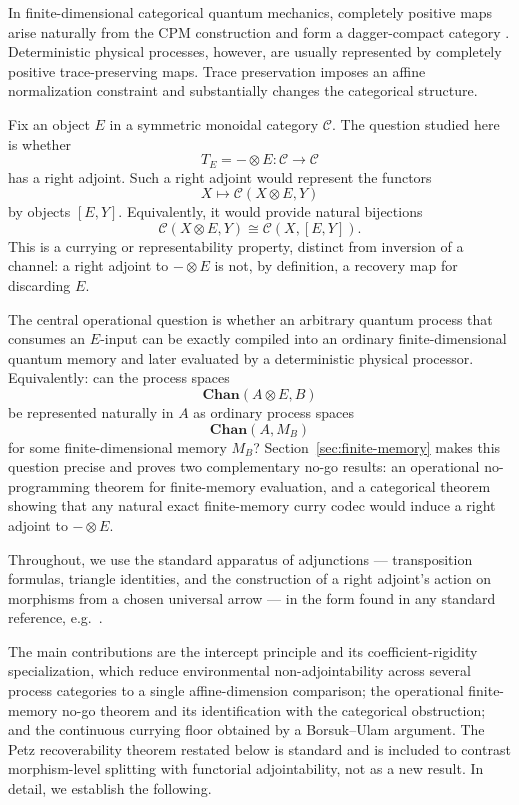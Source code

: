 \documentclass[11pt]{article}
\begin{document}
In finite-dimensional categorical quantum mechanics, completely positive maps
arise naturally from the CPM construction and form a dagger-compact category
\cite{Selinger2007, CoeckeKissinger2017}. Deterministic physical processes,
however, are usually represented by completely positive trace-preserving maps.
Trace preservation imposes an affine normalization constraint and
substantially changes the categorical structure.

Fix an object $E$ in a symmetric monoidal category $\mathcal C$. The question
studied here is whether
\[
T_E=-\otimes E:\mathcal C\longrightarrow \mathcal C
\]
has a right adjoint. Such a right adjoint would represent the functors
\[
X\longmapsto \mathcal C(X\otimes E,Y)
\]
by objects $[E,Y]$. Equivalently, it would provide natural bijections
\[
\mathcal C(X\otimes E,Y)\cong \mathcal C(X,[E,Y]).
\]
This is a currying or representability property, distinct from inversion of a
channel: a right adjoint to $-\otimes E$ is not, by definition, a recovery map
for discarding $E$.

The central operational question is whether an arbitrary quantum process
that consumes an $E$-input can be exactly compiled into an ordinary
finite-dimensional quantum memory and later evaluated by a deterministic
physical processor. Equivalently: can the process spaces
\[
\mathbf{Chan}(A\otimes E,B)
\]
be represented naturally in $A$ as ordinary process spaces
\[
\mathbf{Chan}(A,M_B)
\]
for some finite-dimensional memory $M_B$? Section~\ref{sec:finite-memory}
makes this question precise and proves two complementary no-go results: an
operational no-programming theorem for finite-memory evaluation, and a
categorical theorem showing that any natural exact finite-memory curry codec
would induce a right adjoint to $-\otimes E$.

Throughout, we use the standard apparatus of adjunctions --- transposition
formulas, triangle identities, and the construction of a right adjoint's
action on morphisms from a chosen universal arrow --- in the form found in any
standard reference, e.g.\ \cite{MacLane1998}.

The main contributions are the intercept principle and its coefficient-rigidity
specialization, which reduce environmental non-adjointability across several
process categories to a single affine-dimension comparison; the operational
finite-memory no-go theorem and its identification with the categorical
obstruction; and the continuous currying floor obtained by a Borsuk--Ulam
argument. The Petz recoverability theorem restated below is standard and is
included to contrast morphism-level splitting with functorial adjointability,
not as a new result. In detail, we establish the following.
\end{document}
